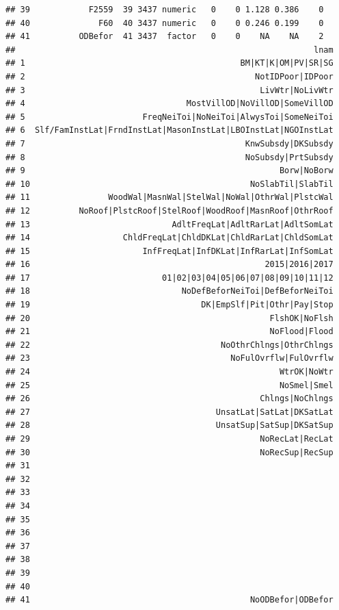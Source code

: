 \documentclass[11pt,]{article}
\begin{document}
\begin{verbatim}
## 39            F2559  39 3437 numeric   0    0 1.128 0.386    0
## 40              F60  40 3437 numeric   0    0 0.246 0.199    0
## 41          ODBefor  41 3437  factor   0    0    NA    NA    2
##                                                             lnam
## 1                                            BM|KT|K|OM|PV|SR|SG
## 2                                               NotIDPoor|IDPoor
## 3                                                LivWtr|NoLivWtr
## 4                                 MostVillOD|NoVillOD|SomeVillOD
## 5                        FreqNeiToi|NoNeiToi|AlwysToi|SomeNeiToi
## 6  Slf/FamInstLat|FrndInstLat|MasonInstLat|LBOInstLat|NGOInstLat
## 7                                             KnwSubsdy|DKSubsdy
## 8                                             NoSubsdy|PrtSubsdy
## 9                                                    Borw|NoBorw
## 10                                             NoSlabTil|SlabTil
## 11                WoodWal|MasnWal|StelWal|NoWal|OthrWal|PlstcWal
## 12          NoRoof|PlstcRoof|StelRoof|WoodRoof|MasnRoof|OthrRoof
## 13                             AdltFreqLat|AdltRarLat|AdltSomLat
## 14                   ChldFreqLat|ChldDKLat|ChldRarLat|ChldSomLat
## 15                       InfFreqLat|InfDKLat|InfRarLat|InfSomLat
## 16                                                2015|2016|2017
## 17                           01|02|03|04|05|06|07|08|09|10|11|12
## 18                               NoDefBeforNeiToi|DefBeforNeiToi
## 19                                   DK|EmpSlf|Pit|Othr|Pay|Stop
## 20                                                 FlshOK|NoFlsh
## 21                                                 NoFlood|Flood
## 22                                       NoOthrChlngs|OthrChlngs
## 23                                         NoFulOvrflw|FulOvrflw
## 24                                                   WtrOK|NoWtr
## 25                                                   NoSmel|Smel
## 26                                               Chlngs|NoChlngs
## 27                                      UnsatLat|SatLat|DKSatLat
## 28                                      UnsatSup|SatSup|DKSatSup
## 29                                               NoRecLat|RecLat
## 30                                               NoRecSup|RecSup
## 31                                                              
## 32                                                              
## 33                                                              
## 34                                                              
## 35                                                              
## 36                                                              
## 37                                                              
## 38                                                              
## 39                                                              
## 40                                                              
## 41                                             NoODBefor|ODBefor
\end{verbatim}
\end{document}
